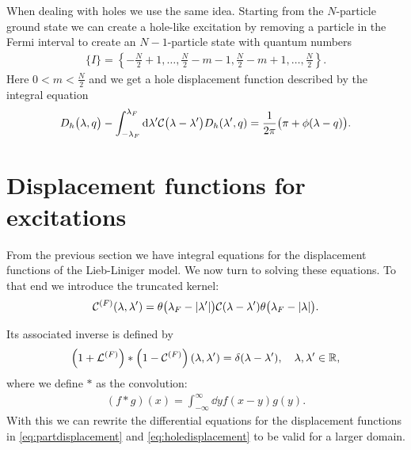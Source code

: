 \documentclass[11pt, a4paper]{report} %
\begin{document}
When dealing with holes we use the same idea.
Starting from the \(N\)-particle ground state we can create a hole-like excitation by removing a particle in the Fermi interval to create an \(N-1\)-particle state with quantum numbers
\begin{align}
  \label{eq:26}
  \{I\} = \left\{-\frac{N}{2}+1,\ldots,\frac{N}{2}-m-1,\frac{N}{2}-m+1,\ldots,\frac{N}{2}\right\}.
\end{align}
Here \(0<m<\frac{N}{2}\) and we get a hole displacement function described by the integral equation~\cite{Caux2015}
\begin{align}
  \label{eq:holedisplacement}
  D_h\qty\big(\lambda,q) - \int_{-\lambda_F}^{\lambda_F} \dd \lambda' \mathcal{C}\qty\big(\lambda-\lambda') D_h\qty(\lambda',q) = \frac{1}{2\pi}\qty\big(\pi+\phi(\lambda-q)).
\end{align}






\section{Displacement functions for excitations}

From the previous section we have integral equations for the displacement functions of the Lieb-Liniger model.
We now turn to solving these equations.
To that end we introduce the truncated kernel:
\begin{align}
  \label{eq:inversetruncated}
  \mathcal{C}^{(F)}\qty(\lambda,\lambda') = \theta\qty\big(\lambda_F-\abs{\lambda'}) \mathcal{C}\qty(\lambda-\lambda') \theta\qty\big(\lambda_F-\abs{\lambda}).
\end{align}

Its associated inverse is defined by
\begin{align}
  \label{eq:32}
  	\left(1 + \mathcal{L}^{(F)}\right) * \left(1 - \mathcal{C}^{(F)}\right)\qty(\lambda,\lambda')=\delta\qty(\lambda-\lambda'), \quad \lambda, \lambda' \in \mathbb{R},
\end{align}
where we define \(*\) as the convolution:
\begin{align}
  \label{eq:29}
  (f*g)(x) = \int_{-\infty}^{\infty} \dd y f(x-y)g(y).
\end{align}
With this we can rewrite the differential equations for the displacement functions in \cref{eq:partdisplacement} and \cref{eq:holedisplacement} to be valid for a larger domain.
\end{document}
